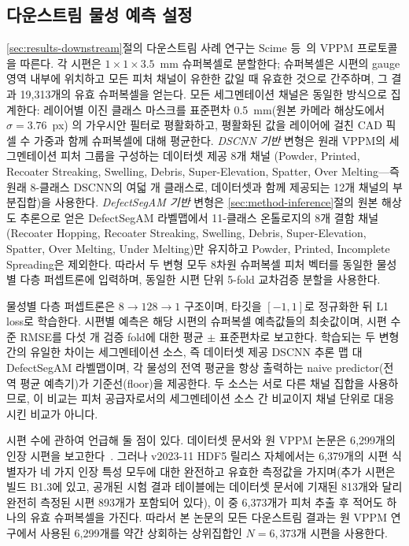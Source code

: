 \subsection{다운스트림 물성 예측 설정}
\label{sec:setup-downstream}

\ref{sec:results-downstream}절의 다운스트림 사례 연구는 Scime
등~\cite{VPPM_Baseline}의 VPPM 프로토콜을 따른다. 각 시편은
\(1 \times 1 \times 3.5\)~mm 슈퍼복셀로 분할한다; 슈퍼복셀은 시편의
gauge 영역 내부에 위치하고 모든 피처 채널이 유한한 값일 때 유효한
것으로 간주하며, 그 결과 19{,}313개의 유효 슈퍼복셀을 얻는다. 모든
세그멘테이션 채널은 동일한 방식으로 집계한다: 레이어별 이진 클래스
마스크를 표준편차 0.5~mm(원본 카메라 해상도에서 \(\sigma = 3.76\)~px)
의 가우시안 필터로 평활화하고, 평활화된 값을 레이어에 걸친 CAD 픽셀
수 가중과 함께 슈퍼복셀에 대해 평균한다. \emph{DSCNN 기반} 변형은 원래
VPPM의 세그멘테이션 피처 그룹을 구성하는 데이터셋 제공 8개 채널
(Powder, Printed, Recoater Streaking, Swelling, Debris,
Super-Elevation, Spatter, Over Melting---즉 원래 8-클래스 DSCNN의 여덟
개 클래스로, 데이터셋과 함께 제공되는 12개 채널의 부분집합)을
사용한다. \emph{DefectSegAM 기반} 변형은 \ref{sec:method-inference}절의
원본 해상도 추론으로 얻은 DefectSegAM 라벨맵에서 11-클래스 온톨로지의
8개 결함 채널(Recoater Hopping, Recoater Streaking, Swelling, Debris,
Super-Elevation, Spatter, Over Melting, Under Melting)만 유지하고
Powder, Printed, Incomplete Spreading은 제외한다. 따라서 두 변형 모두
8차원 슈퍼복셀 피처 벡터를 동일한 물성별 다층 퍼셉트론에 입력하며,
동일한 시편 단위 5-fold 교차검증 분할을 사용한다.

물성별 다층 퍼셉트론은 \(8 \to 128 \to 1\) 구조이며, 타깃을
\([-1, 1]\)로 정규화한 뒤 L1 loss로 학습한다. 시편별 예측은 해당
시편의 슈퍼복셀 예측값들의 최솟값이며, 시편 수준 RMSE를 다섯 개 검증
fold에 대한 평균 \(\pm\) 표준편차로 보고한다. 학습되는 두 변형 간의
유일한 차이는 세그멘테이션 소스, 즉 데이터셋 제공 DSCNN 추론 맵 대
DefectSegAM 라벨맵이며, 각 물성의 전역 평균을 항상 출력하는 naive
predictor(전역 평균 예측기)가 기준선(floor)을 제공한다. 두 소스는
서로 다른 채널 집합을 사용하므로, 이 비교는 피처 공급자로서의
세그멘테이션 소스 간 비교이지 채널 단위로 대응시킨 비교가 아니다.

시편 수에 관하여 언급해 둘 점이 있다. 데이터셋 문서와 원 VPPM 논문은
6{,}299개의 인장 시편을
보고한다~\cite{ORNL_CoRegistered_Dataset,VPPM_Baseline}. 그러나
v2023-11 HDF5 릴리스 자체에서는 6{,}379개의 시편 식별자가 네 가지 인장
특성 모두에 대한 완전하고 유효한 측정값을 가지며(추가 시편은 빌드
B1.3에 있고, 공개된 시험 결과 테이블에는 데이터셋 문서에 기재된
813개와 달리 완전히 측정된 시편 893개가 포함되어 있다), 이 중
6{,}373개가 피처 추출 후 적어도 하나의 유효 슈퍼복셀을 가진다. 따라서
본 논문의 모든 다운스트림 결과는 원 VPPM 연구에서 사용된 6{,}299개를
약간 상회하는 상위집합인 \(N = 6{,}373\)개 시편을 사용한다.
